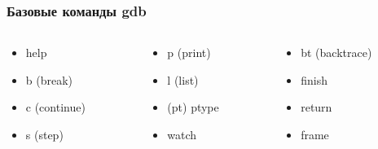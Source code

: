 \begin{frame}
  \frametitle{Базовые команды gdb}
  \begin{columns}
    \begin{column}{0.3\textwidth}
      \begin{itemize}
        \item help
        \item b (break)
        \item c (continue)
        \item s (step)
      \end{itemize}
    \end{column}
    
    \begin{column}{0.3\textwidth}
      \begin{itemize}
        \item p (print)
        \item l (list)
        \item (pt) ptype
        \item watch
      \end{itemize}
    \end{column}

    \begin{column}{0.3\textwidth}
      \begin{itemize}
        \item bt (backtrace)
        \item finish
        \item return
        \item frame
      \end{itemize}
    \end{column}
  \end{columns}
\end{frame}

